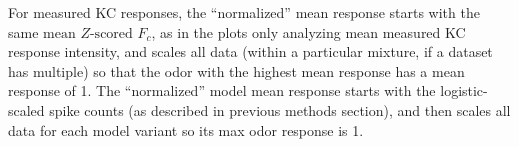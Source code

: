 \documentclass[12pt]{caltech_thesis}
\newcommand{\KCRespStat}{\ensuremath{\text{mean }\mathit{Z}\text{-scored $F_c$}}}
\newcommand{\cid}[1]{\href{https://pubchem.ncbi.nlm.nih.gov/compound/#1}{#1}}
\newcommand*{\LoadChemFigTexFromCID}[2][]{\adjustbox{valign=m,#1}{}}
\begin{document}
\begin{refsection}
For measured KC responses, the ``normalized'' mean response starts with the same \KCRespStat, as in the plots only analyzing mean measured KC response intensity, and scales all data (within a particular mixture, if a dataset has multiple) so that the odor with the highest mean response has a mean response of 1.
The ``normalized'' model mean response starts with the logistic-scaled spike counts (as described in previous methods section), and then scales all data for each model variant so its max odor response is 1.

\processdelayedfloats
\clearpage
%

\ReferencesSection
\end{refsection}

\supplementsection

\begingroup
\renewcommand{\arraystretch}{1.9}

\newcommand{\LoadChemFigWithScale}{\LoadChemFigTexFromCID[scale=0.9]}
\newcolumntype{Z}{>{\collectcell\LoadChemFigWithScale}p{1.9cm}<{\endcollectcell}}

\end{document}
